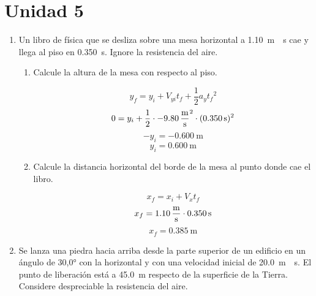 \documentclass[Física - Práctica.root.tex]{subfiles}
\begin{document}
\section{Unidad 5}

\begin{enumerate}
  \item Un libro de física que se desliza sobre una mesa horizontal a \SI{1,10}{\meter\over\second} cae y llega al piso en \SI{0,350}{\second}. Ignore la resistencia del aire.

        \begin{center}
        \end{center}

        \begin{enumerate}
          \item Calcule la altura de la mesa con respecto al piso.

                \[y_f=y_i+V_{yi}t_f+\frac{1}{2}a_y{t_f}^2\]
                \[0=y_i+\frac{1}{2}\cdot\SI{-9,80}{\meter\over\second\squared}\cdot(\SI{0,350}{\second})^2\]
                \[-y_i=\SI{-0,600}{\meter}\]
                \[y_i=\boxed{\SI{0,600}{\meter}}\]

          \item Calcule la distancia horizontal del borde de la mesa al punto donde cae el libro.

                \[x_f=x_i+V_xt_f\]
                \[x_f=\SI{1,10}{\meter\over\second}\cdot\SI{0,350}{\second}\]
                \[x_f=\boxed{\SI{0,385}{\meter}}\]
        \end{enumerate}

  \item Se lanza una piedra hacia arriba desde la parte superior de un edificio en un ángulo de \ang{30,0} con la horizontal y con una velocidad inicial de \SI{20,0}{\meter\over\second}. El punto de liberación está a \SI{45,0}{\meter} respecto de la superficie de la Tierra. Considere despreciable la resistencia del aire.


\end{enumerate}
\end{document}
